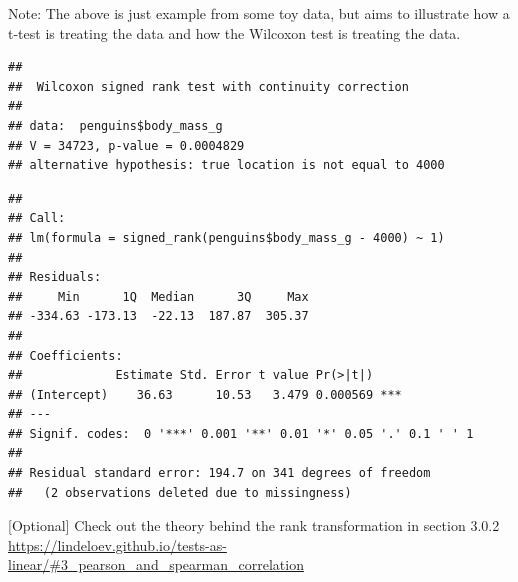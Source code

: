 \documentclass[
]{book}
\newenvironment{Shaded}{\begin{snugshade}}{\end{snugshade}}
\newcommand{\AttributeTok}[1]{\textcolor[rgb]{0.77,0.63,0.00}{#1}}
\newcommand{\CommentTok}[1]{\textcolor[rgb]{0.56,0.35,0.01}{\textit{#1}}}
\newcommand{\ControlFlowTok}[1]{\textcolor[rgb]{0.13,0.29,0.53}{\textbf{#1}}}
\newcommand{\DecValTok}[1]{\textcolor[rgb]{0.00,0.00,0.81}{#1}}
\newcommand{\FunctionTok}[1]{\textcolor[rgb]{0.00,0.00,0.00}{#1}}
\newcommand{\NormalTok}[1]{#1}
\newcommand{\OtherTok}[1]{\textcolor[rgb]{0.56,0.35,0.01}{#1}}
\newcommand{\SpecialCharTok}[1]{\textcolor[rgb]{0.00,0.00,0.00}{#1}}
\begin{document}
Note: The above is just example from some toy data, but aims to illustrate how a t-test is treating the data and how the Wilcoxon test is treating the data.

\begin{Shaded}
\end{Shaded}

\begin{verbatim}
## 
##  Wilcoxon signed rank test with continuity correction
## 
## data:  penguins$body_mass_g
## V = 34723, p-value = 0.0004829
## alternative hypothesis: true location is not equal to 4000
\end{verbatim}

\begin{Shaded}
\end{Shaded}

\begin{verbatim}
## 
## Call:
## lm(formula = signed_rank(penguins$body_mass_g - 4000) ~ 1)
## 
## Residuals:
##     Min      1Q  Median      3Q     Max 
## -334.63 -173.13  -22.13  187.87  305.37 
## 
## Coefficients:
##             Estimate Std. Error t value Pr(>|t|)    
## (Intercept)    36.63      10.53   3.479 0.000569 ***
## ---
## Signif. codes:  0 '***' 0.001 '**' 0.01 '*' 0.05 '.' 0.1 ' ' 1
## 
## Residual standard error: 194.7 on 341 degrees of freedom
##   (2 observations deleted due to missingness)
\end{verbatim}

{[}Optional{]} Check out the theory behind the rank transformation in section 3.0.2 \url{https://lindeloev.github.io/tests-as-linear/\#3_pearson_and_spearman_correlation}
\end{document}
